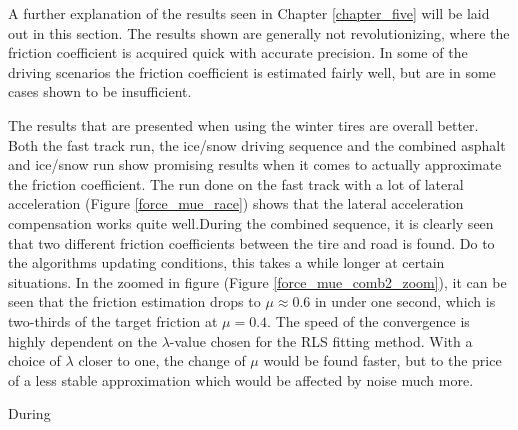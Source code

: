 A further explanation of the results seen in Chapter \ref{chapter_five} will be laid out in this section. The results shown are generally not revolutionizing, where the friction coefficient is acquired quick with accurate precision. In some of the driving scenarios the friction coefficient is estimated fairly well, but are in some cases shown to be insufficient. 

The results that are presented when using the winter tires are overall better. Both the fast track run, the ice/snow driving sequence and the combined asphalt and ice/snow run show promising results when it comes to actually approximate the friction coefficient. The run done on the fast track with a lot of lateral acceleration (Figure \ref{force_mue_race}) shows that the lateral acceleration compensation works quite well.During the combined sequence, it is clearly seen that two different friction coefficients between the tire and road is found. Do to the algorithms updating conditions, this takes a while longer at certain situations. In the zoomed in figure (Figure \ref{force_mue_comb2_zoom}), it can be seen that the friction estimation drops to $ \mu \approx 0.6 $ in under one second, which is two-thirds of the target friction at $ \mu = 0.4 $. The speed of the convergence is highly dependent on the $ \lambda $-value chosen for the RLS fitting method. With a choice of $ \lambda $ closer to one, the change of $ \mu $ would be found faster, but to the price of a less stable approximation which would be affected by noise much more. 

During 